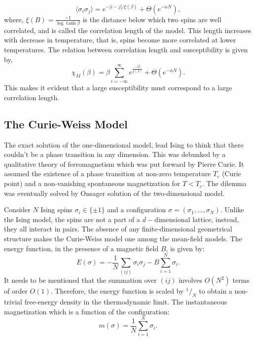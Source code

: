 \documentclass[letterpaper,english,10pt]{article}
\begin{document}
\begin{defn}
\begin{defn}[Susceptibility]
$$\langle \sigma_{i}\sigma_{j}\rangle = e^{-|i-j|/\xi(\beta)}+ \Theta (e^{-\alpha N}),$$
where, $\xi(B) = \frac{-1}{\log \tanh \beta}$ is the distance below which two spins are well correlated, and is called the correlation length of the model. This length increases with decrease in temperature, that is, spins become more correlated at lower temperatures. The relation between correlation length and susceptibility is given by,
\begin{equation}
\chi_{M}(\beta)=\beta \sum_{i=-\infty}^{\infty}e^{\frac{-|i|}{\xi(\beta)}}+\Theta(e^{-\alpha N}).
\end{equation}
This makes it evident that a large susceptibility must correspond to a large correlation length. 
	\end{defn}
\end{defn}
\subsection{The Curie-Weiss Model}

The exact solution of the one-dimensional model, lead Ising to think that there couldn’t be a phase transition in any dimension. This was debunked by a qualitative theory of ferromagnetism which was put forward by Pierre Curie. It assumed the existence of a phase transition at non-zero temperature $T_{c}$ (Curie point) and a non-vanishing spontaneous magnetization for $T<T_{c}$. The dilemma was eventually solved by Onsager solution of the two-dimensional model. 

Consider $N$ Ising spins $\sigma_{i}\in \{\pm 1\}$ and a configuration $\sigma = (\sigma_{1},\hdots,\sigma_{N})$. Unlike the Ising model, the spins are not a part of a $d-$dimensional lattice, instead, they all interact in pairs. The absence of any finite-dimensional geometrical structure makes the Curie-Weiss model one among the mean-field models. The energy function, in the presence of a magnetic field $B$, is given by:
$$E(\sigma) = -\frac{1}{N}\sum_{(ij)}\sigma_{i}\sigma_{j}-B\sum_{i=1}^{N}\sigma_{i}.$$ 
It needs to be mentioned that the summation over $(ij)$ involves $O(N^{2})$ terms of order $O(1)$. Therefore, the energy function is scaled by $^1/_N$ to obtain a non-trivial free-energy density in the thermodynamic limit. The instantaneous magnetization which is a function of the configuration:
$$m(\sigma) = \frac{1}{N}\sum_{i=1}^{N}\sigma_{i}.$$
\end{document}
